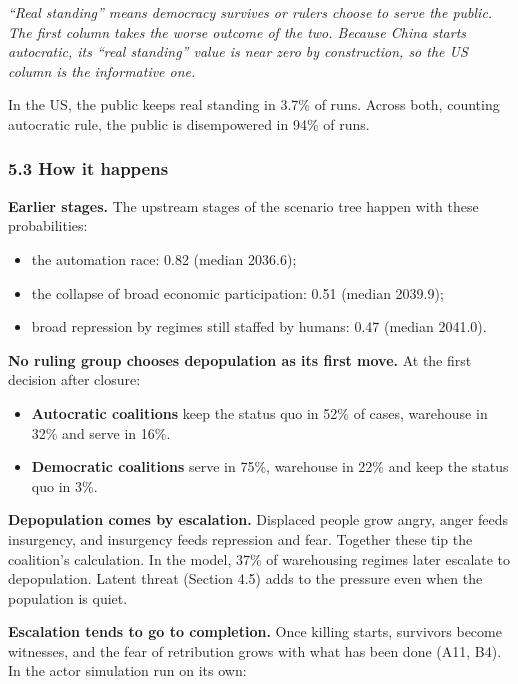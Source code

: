 \documentclass[
  10pt,
]{article}
\providecommand{\tightlist}{%
  \setlength{\itemsep}{0pt}\setlength{\parskip}{0pt}}
\begin{document}
\emph{``Real standing'' means democracy survives or rulers choose to serve the public. The first
column takes the worse outcome of the two. Because China starts autocratic, its ``real standing''
value is near zero by construction, so the US column is the informative one.}

In the US, the public keeps real standing in 3.7\% of runs. Across both, counting autocratic rule,
the public is disempowered in 94\% of runs.

\subsubsection{5.3 How it happens}\label{how-it-happens}

\textbf{Earlier stages.} The upstream stages of the scenario tree happen with these probabilities:

\begin{itemize}
\tightlist
\item
  the automation race: 0.82 (median 2036.6);
\item
  the collapse of broad economic participation: 0.51 (median 2039.9);
\item
  broad repression by regimes still staffed by humans: 0.47 (median 2041.0).
\end{itemize}

\textbf{No ruling group chooses depopulation as its first move.} At the first decision after
closure:

\begin{itemize}
\tightlist
\item
  \textbf{Autocratic coalitions} keep the status quo in 52\% of cases, warehouse in 32\% and serve
  in 16\%.
\item
  \textbf{Democratic coalitions} serve in 75\%, warehouse in 22\% and keep the status quo in 3\%.
\end{itemize}

\textbf{Depopulation comes by escalation.} Displaced people grow angry, anger feeds insurgency, and
insurgency feeds repression and fear. Together these tip the coalition's calculation. In the model,
37\% of warehousing regimes later escalate to depopulation. Latent threat (Section 4.5) adds to the
pressure even when the population is quiet.

\textbf{Escalation tends to go to completion.} Once killing starts, survivors become witnesses, and
the fear of retribution grows with what has been done (A11, B4). In the actor simulation run on its
own:
\end{document}
